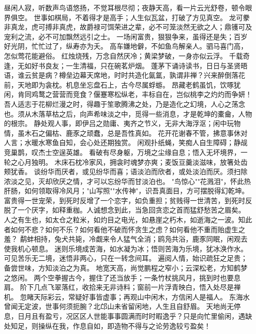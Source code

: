 \documentclass[12pt,UTF8]{ctexbook}
\begin{document}
昼闲人寂，听数声鸟语悠扬，不觉耳根尽彻；夜静天高，看一片云光舒卷，顿令眼界俱空。
世事如棋局，不着得才是高手；人生似瓦盆，打破了方见真空。
龙可豢非真龙，虎可搏非真虎，故爵禄可饵荣进之辈，必不可笼淡然无欲之人；鼎镬可及宠利之流，必不可加飘然远引之士。
一场闲富贵，狠狠争来，虽得还是失；百岁好光阴，忙忙过了，纵寿亦为夭。
高车嫌地僻，不如鱼鸟解亲人。驷马喜门高，怎似莺花能避俗。
红烛烧残，万念自然厌冷；黄梁梦破，一身亦似云浮。
千载奇逢，无如好书良友；一生清福，只在碗茗炉烟。
蓬茅下诵诗读书，日日与圣贤晤语，谁云贫是病？樽垒边幕天席地，时时共造化氤氲，孰谓非禅？兴来醉倒落花前，天地即为衾枕。机息坐忘盘石上，古今尽属蜉蝣。
昂藏老鹤虽饥，饮啄犹闲，肯同鸡鹜之营营而竞食？偃蹇寒松纵老，丰标自在，岂似桃李之灼灼而争妍！
吾人适志于花柳烂漫之时，得趣于笙歌腾沸之处，乃是造化之幻境，人心之荡念也。须从木落草枯之后，向声希味淡之中，觅得一些消息，才是乾坤的橐龠，人物的根宗。
静处观人事，即伊吕之勋庸、夷齐之节义，无非大海浮沤；闲中玩物情，虽木石之偏枯、鹿豕之顽蠢，总是吾性真如。
花开花谢春不管，拂意事休对人言；水暖水寒鱼自知，会心处还期独赏。
闲观扑纸蝇，笑痴人自生障碍；静觇竞巢鹊，叹杰士空逞英雄。
看破有尽身躯，万境之尘缘自息；悟入无坏境界，一轮之心月独明。
木床石枕冷家风，拥衾时魂梦亦爽；麦饭豆羹淡滋味，放箸处齿颊犹香。
谈纷华而厌者，或见纷华而喜；语淡泊而欣者，或处淡泊而厌。须扫除浓淡之见，灭却欣厌之情，才可以忘纷华而甘淡泊也。
"鸟惊心""花溅泪"，怀此热肝肠，如何领取得冷风月；"山写照""水传神"，识吾真面目，方可摆脱得幻乾坤。富贵得一世宠荣，到死时反增了一个恋字，如负重担；贫贱得一世清苦，到死时反脱了一个厌字，如释重枷。人诚想念到此，当急回贪恋之首而猛舒愁苦之眉矣。
人之有生也，如太仓之粒米，如灼目之电光，如悬崖之朽木，如逝海之一波。知此者如何不悲？如何不乐？如何看他不破而怀贪生之虑？如何看他不重而贻虚生之羞？
鹬蚌相持，兔犬共毙，冷觑来令人猛气全消；鸥凫共浴，鹿豕同眠，闲观去使我机心顿息。
迷则乐境成苦海，如水凝为冰；悟则苦海为乐境，犹冰涣作水。可见苦乐无二境，迷悟非两心，只在一转念间耳。
遍阅人情，始识疏狂之足贵；备尝世味，方知淡泊之为真。
地宽天高，尚觉鹏程之窄小；云深松老，方知鹤梦之悠闲。
两个空拳握古今，握住了还当放手；一条竹杖挑风月，挑到时也要息肩。
阶下几点飞翠落红，收拾来无非诗料；窗前一片浮青映白，悟入处尽是禅机。
忽睹天际彩云，常疑好事皆虚事；再观山中闲木，方信闲人是福人。
东海水曾闻无定波，世事何须扼腕？北邙山未省留闲地，人生且自舒眉。
天地尚无停息，日月且有盈亏，况区区人世能事事圆满而时时暇逸乎？只是向忙里偷闲，遇缺处知足，则操纵在我，作息自如，即造物不得与之论劳逸较亏盈矣！
\end{document}
